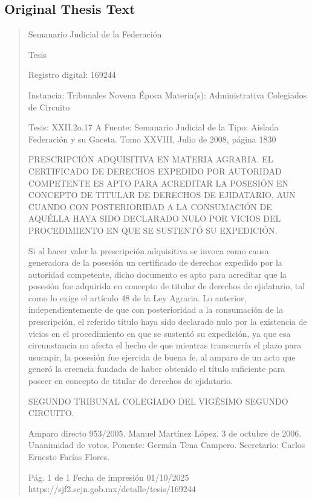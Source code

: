 \documentclass[11pt,a4paper]{article}
\begin{document}
\subsection{Original Thesis Text}

\begin{quote}
                                                   Semanario Judicial de la Federación

                                                  Tesis

 Registro digital: 169244

 Instancia: Tribunales             Novena Época                          Materia(s): Administrativa
 Colegiados de Circuito

 Tesis: XXII.2o.17 A               Fuente: Semanario Judicial de la   Tipo: Aislada
                                   Federación y su Gaceta.
                                   Tomo XXVIII, Julio de 2008, página
                                   1830


PRESCRIPCIÓN ADQUISITIVA EN MATERIA AGRARIA. EL CERTIFICADO DE DERECHOS
EXPEDIDO POR AUTORIDAD COMPETENTE ES APTO PARA ACREDITAR LA POSESIÓN EN
CONCEPTO DE TITULAR DE DERECHOS DE EJIDATARIO, AUN CUANDO CON
POSTERIORIDAD A LA CONSUMACIÓN DE AQUÉLLA HAYA SIDO DECLARADO NULO POR
VICIOS DEL PROCEDIMIENTO EN QUE SE SUSTENTÓ SU EXPEDICIÓN.


Si al hacer valer la prescripción adquisitiva se invoca como causa generadora de la posesión un
certificado de derechos expedido por la autoridad competente, dicho documento es apto para
acreditar que la posesión fue adquirida en concepto de titular de derechos de ejidatario, tal como lo
exige el artículo 48 de la Ley Agraria. Lo anterior, independientemente de que con posterioridad a la
consumación de la prescripción, el referido título haya sido declarado nulo por la existencia de vicios
en el procedimiento en que se sustentó su expedición, ya que esa circunstancia no afecta el hecho
de que mientras transcurría el plazo para usucapir, la posesión fue ejercida de buena fe, al amparo
de un acto que generó la creencia fundada de haber obtenido el título suficiente para poseer en
concepto de titular de derechos de ejidatario.

SEGUNDO TRIBUNAL COLEGIADO DEL VIGÉSIMO SEGUNDO CIRCUITO.


Amparo directo 953/2005. Manuel Martínez López. 3 de octubre de 2006. Unanimidad de votos.
Ponente: Germán Tena Campero. Secretario: Carlos Ernesto Farías Flores.




                                              Pág. 1 de 1             Fecha de impresión 01/10/2025
  https://sjf2.scjn.gob.mx/detalle/tesis/169244

\end{quote}
\end{document}
